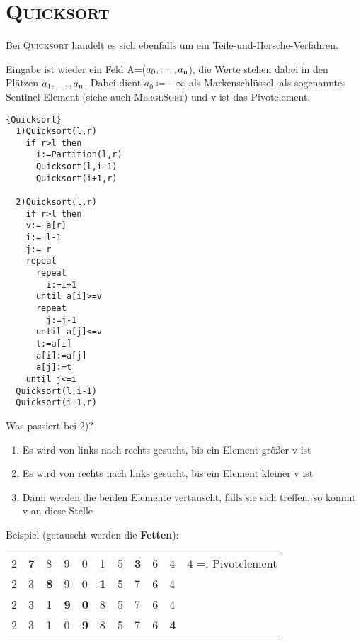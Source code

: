 \documentclass[ngerman,draft,parskip=half*,twoside]{scrreprt}
\theoremstyle{break}
\theoremstyle{nonumberbreak}
\begin{document}
\section{\textsc{Quicksort}}
Bei \textsc{Quicksort} handelt es sich ebenfalls um ein Teile-und-Hersche-Verfahren.

Eingabe ist wieder ein Feld A=($a_0, \ldots, a_{\textup{n}}$), die Werte stehen dabei in den Plätzen $a_1, \ldots, a_{\textup{n}}$.
Dabei dient $a_0\coloneqq -\infty$ als Markenschlüssel, als sogenanntes Sentinel-Element (siehe auch \textsc{MergeSort}) und
v ist das Pivotelement.

\begin{Algorithmus}[H]
\begin{lstlisting}[frame=tlrb, mathescape=true, title=\textsc{Quicksort}, gobble=2]{Quicksort}
  1)Quicksort(l,r)
    if r>l then
      i:=Partition(l,r)
      Quicksort(l,i-1)
      Quicksort(i+1,r) 

  2)Quicksort(l,r)
    if r>l then
    v:= a[r] 
    i:= l-1 
    j:= r
    repeat
      repeat 
        i:=i+1 
      until a[i]>=v
      repeat 
        j:=j-1 
      until a[j]<=v
      t:=a[i]  
      a[i]:=a[j] 
      a[j]:=t
    until j<=i
  Quicksort(l,i-1)
  Quicksort(i+1,r) 
\end{lstlisting}
\end{Algorithmus}

Was passiert bei 2)?
\begin{enumerate}
\item Es wird von links nach rechts gesucht, bis ein Element größer v ist
\item Es wird von rechts nach links gesucht, bis ein Element kleiner v ist
\item Dann werden die beiden Elemente vertauscht, falls sie sich treffen, so kommt v an diese Stelle
\end{enumerate}

Beispiel (getauscht werden die \textbf{Fetten}):

\begin{tabular}{lllllllllll}
2 & \textbf{7} & 8 & 9 & 0 & 1 & 5 & \textbf{3} & 6 & 4 & \hspace{15pt} 4 =: Pivotelement\\
2 & 3 & \textbf{8} & 9 & 0 & \textbf{1} & 5 & 7 & 6 & 4 &\\ 
2 & 3 & 1 & \textbf{9} & \textbf{0} & 8 & 5 & 7 & 6 & 4 &\\
2 & 3 & 1 & 0 & \textbf{9} & 8 & 5 & 7 & 6 & \textbf{4} &\\
\end{tabular}
\end{document}
